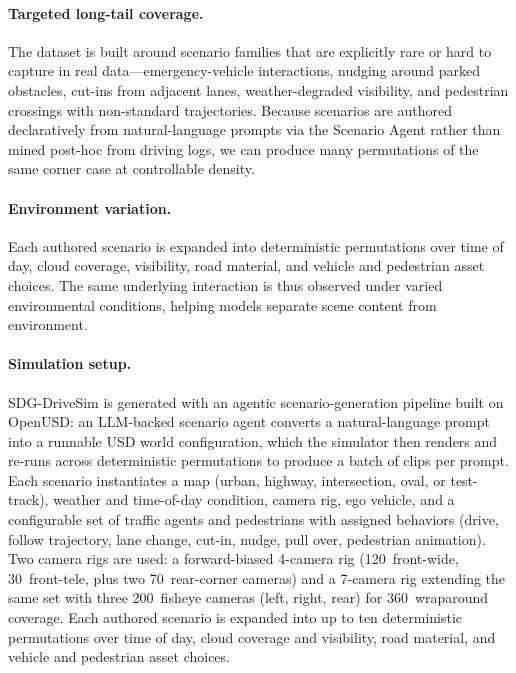 \paragraph{Targeted long-tail coverage.} The dataset is built around scenario families that are explicitly rare or hard to capture in real data---emergency-vehicle interactions, nudging around parked obstacles, cut-ins from adjacent lanes, weather-degraded visibility, and pedestrian crossings with non-standard trajectories. Because scenarios are authored declaratively from natural-language prompts via the Scenario Agent rather than mined post-hoc from driving logs, we can produce many permutations of the same corner case at controllable density.

\paragraph{Environment variation.} Each authored scenario is expanded into deterministic permutations over time of day, cloud coverage, visibility, road material, and vehicle and pedestrian asset choices. The same underlying interaction is thus observed under varied environmental conditions, helping models separate scene content from environment.



\paragraph{Simulation setup.}
\label{appendix:sdg_drive_simulation_setup}
SDG-DriveSim is generated with an agentic scenario-generation pipeline built on OpenUSD: an LLM-backed scenario agent converts a natural-language prompt into a runnable USD world configuration, which the simulator then renders and re-runs across deterministic permutations to produce a batch of clips per prompt. Each scenario instantiates a map (urban, highway, intersection, oval, or test-track), weather and time-of-day condition, camera rig, ego vehicle, and a configurable set of traffic agents and pedestrians with assigned behaviors (drive, follow trajectory, lane change, cut-in, nudge, pull over, pedestrian animation). Two camera rigs are used: a forward-biased 4-camera rig (120\textdegree~front-wide, 30\textdegree~front-tele, plus two 70\textdegree~rear-corner cameras) and a 7-camera rig extending the same set with three 200\textdegree~fisheye cameras (left, right, rear) for 360\textdegree~wraparound coverage. Each authored scenario is expanded into up to ten deterministic permutations over time of day, cloud coverage and visibility, road material, and vehicle and pedestrian asset choices.

